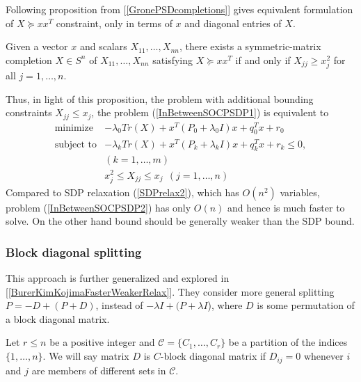\documentclass[12pt]{book}
\theoremstyle{definition}
\begin{document}
Following proposition from [\ref{GronePSDcompletions}] gives equivalent formulation of $X\succeq xx^T$ constraint, only in terms of $x$ and diagonal entries of $X$.

\prop[{[\ref{GronePSDcompletions}]}]
\label{PropGronePSDcompletion} Given a vector $x$ and scalars $X_{11},\dots ,X_{nn}$, there exists
a symmetric-matrix completion $X\in S^n$ of $X_{11},\dots ,X_{nn}$ satisfying $X \succeq xx^T$ if and only if $X_{jj} \geq x^2_j$ for all $j = 1,\dots ,n.$ \rm 

Thus, in light of this proposition, the problem with additional bounding constraints $X_{jj}\leq x_j$, the problem (\ref{InBetweenSOCPSDP1}) is equivalent to 
\begin{equation}
\label{InBetweenSOCPSDP2}
\begin{array}{ll}
\mbox{minimize}& -\lambda_0 Tr(X) +  x^T(P_0+\lambda_0 I)x + q_0^Tx + r_0 \\
\mbox{subject to}& -\lambda_k Tr(X) +  x^T(P_k+\lambda_kI)x + q_k^Tx + r_k \leq 0, \\ &(k = 1,\dots ,m) \\
& x_j^2\leq X_{jj} \leq x_j \ \ (j = 1,\dots ,n)
\end{array} 
\end{equation}
Compared to SDP relaxation (\ref{SDPrelax2}), which has $O(n^2)$ variables, problem (\ref{InBetweenSOCPSDP2}) has only $O(n)$ and hence is much faster to solve. On the other hand bound should be generally weaker than the SDP bound.


\subsubsection{Block diagonal splitting}
This approach is further generalized and explored in [\ref{BurerKimKojimaFasterWeakerRelax}]. 
They consider more general splitting $P= -D + (P+D)$, instead of $-\lambda I + (P +\lambda I$), where $D$ is some permutation of a block diagonal matrix. 


Let $r\leq n$ be a positive integer and $\mathcal{C} = \{C_1,\dots , C_r\}$ be a partition of the indices $\{1,\dots ,n\}$. 
We will say matrix $D$ is $C$-block diagonal matrix if $D_{ij} = 0$ whenever $i$ and $j$ are members of different sets in $\mathcal{C}$. 
\end{document}
